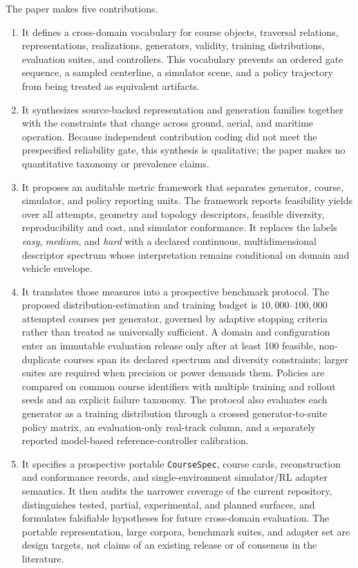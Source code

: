 The paper makes five contributions.
\begin{enumerate}
  \item It defines a cross-domain vocabulary for course objects, traversal relations,
  representations, realizations, generators, validity, training distributions,
  evaluation suites, and controllers. This vocabulary prevents an ordered gate
  sequence, a sampled centerline, a simulator scene, and a policy trajectory from
  being treated as equivalent artifacts.

  \item It synthesizes source-backed representation and generation families together
  with the constraints that change across ground, aerial, and maritime operation.
  Because independent contribution coding did not meet the prespecified reliability
  gate, this synthesis is qualitative; the paper makes no quantitative taxonomy or
  prevalence claims.

  \item It proposes an auditable metric framework that separates generator, course,
  simulator, and policy reporting units. The framework reports feasibility yields
  over all attempts, geometry and topology descriptors, feasible diversity,
  reproducibility and cost, and simulator conformance. It replaces the labels
  \emph{easy}, \emph{medium}, and \emph{hard} with a declared continuous,
  multidimensional descriptor spectrum whose interpretation remains conditional on
  domain and vehicle envelope.

  \item It translates those measures into a prospective benchmark protocol. The
  proposed distribution-estimation and training budget is
  $10{,}000$--$100{,}000$ attempted courses per generator, governed by adaptive
  stopping criteria rather than treated as universally sufficient. A domain and
  configuration enter an immutable evaluation release only after at least 100
  feasible, non-duplicate courses span its declared spectrum and diversity
  constraints; larger suites are required when precision or power demands them.
  Policies are compared on common course identifiers with multiple training and
  rollout seeds and an explicit failure taxonomy.
  The protocol also evaluates each generator as a training distribution through a
  crossed generator-to-suite policy matrix, an evaluation-only real-track column, and
  a separately reported model-based reference-controller calibration.

  \item It specifies a prospective portable \texttt{CourseSpec}, course cards,
  reconstruction and conformance records, and single-environment simulator/RL adapter
  semantics. It then audits the narrower coverage of the current \TrackGen{}
  repository, distinguishes tested, partial, experimental, and planned surfaces, and
  formulates falsifiable hypotheses for future cross-domain evaluation. The portable
  representation, large corpora, benchmark suites, and adapter set are design targets,
  not claims of an existing release or of consensus in the literature.
\end{enumerate}


